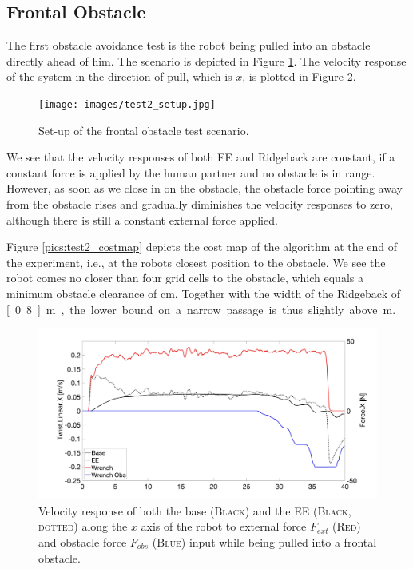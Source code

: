 \subsection{Frontal Obstacle}
The first obstacle avoidance test is the robot being pulled into an obstacle directly ahead of him. The scenario is depicted in Figure \ref{pics:test2_setup}. The velocity response of the system in the direction of pull, which is $x$, is plotted in Figure \ref{pics:test2}.

\begin{figure}
   \centering
   \texttt{[image: images/test2\_setup.jpg]}
   \caption{Set-up of the frontal obstacle test scenario.}
   \label{pics:test2_setup}
\end{figure}

We see that the velocity responses of both EE and Ridgeback are constant, if a constant force is applied by the human partner and no obstacle is in range. However, as soon as we close in on the obstacle, the obstacle force pointing away from the obstacle rises and gradually diminishes the velocity responses to zero, although there is still a constant external force applied.

Figure \ref{pics:test2_costmap} depicts the cost map of the algorithm at the end of the experiment, i.e., at the robots closest position to the obstacle. We see the robot comes no closer than four grid cells to the obstacle, which equals a minimum obstacle clearance of \unit[12]{cm}. Together with the width of the Ridgeback of \unit[0.8]{m}, the lower bound on a narrow passage is thus slightly above\unit[1]{m}.

\begin{figure}
   \centering
   \includegraphics[width=\textwidth]{images/test2.jpg}
   \caption{Velocity response of both the base (\textsc{Black}) and the EE (\textsc{Black, dotted}) along the $x$ axis of the robot to external force $F_{ext}$ (\textsc{Red}) and obstacle force $F_{obs}$ (\textsc{Blue}) input while being pulled into a frontal obstacle.}
   \label{pics:test2}
\end{figure}

